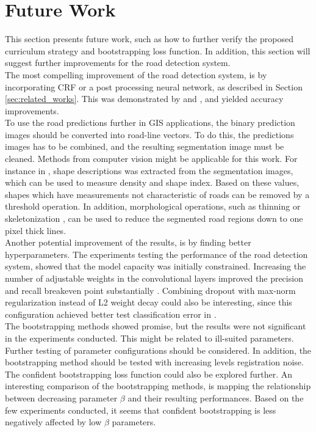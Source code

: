 \section{Future Work}
\label{sec:futureWork}
This section presents future work, such as how to further verify the proposed curriculum strategy and bootstrapping loss function. In addition, this section will suggest further improvements for the road detection system.\\

The most compelling improvement of the road detection system, is by incorporating \ac{CRF} or a post processing neural network, as described in Section \ref{sec:related_works}. This was demonstrated by \cite{Kluckner_semantic_height} and \cite{Mnih_aerial_images_noisy} , and yielded accuracy improvements. \\

To use the road predictions further in GIS applications, the binary prediction images should be converted into road-line vectors. To do this, the predictions images has to be combined, and the resulting segmentation image must be cleaned. Methods from computer vision might be applicable for this work. For instance in \citep{Song_road_extraction_svm}, shape descriptions was extracted from the segmentation images, which can be used to measure density and shape index. Based on these values, shapes which have measurements not characteristic of roads can be removed by a threshold operation. In addition, morphological operations, such as thinning or skeletonization , can be used to reduce the segmented road regions down to one pixel thick lines. \\

Another potential improvement of the results, is by finding better hyperparameters. The experiments testing the performance of the road detection system, showed that the model capacity was initially constrained. Increasing the number of adjustable weights in the convolutional layers improved the precision and recall breakeven point substantially . Combining dropout with max-norm regularization instead of L2 weight decay could also be interesting, since this configuration achieved better test classification error in \citep{Srivastava_dropout}.\\

The bootstrapping methods showed promise, but the results were not significant in the experiments conducted. This might be related to ill-suited parameters. Further testing of parameter configurations should be considered. In addition, the bootstrapping method should be tested with increasing levels registration noise. The confident bootstrapping loss function could also be explored further. An interesting comparison of the bootstrapping methods, is mapping the relationship between decreasing parameter $\beta$ and their resulting performances. Based on the few experiments conducted, it seems that confident bootstrapping is less negatively affected by low $\beta$ parameters.\\



